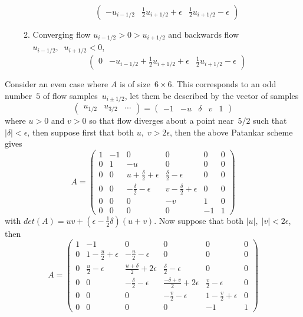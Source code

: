 \begin{enumerate}
\begin{enumerate}
\begin{equation}
\begin{pmatrix}
-u_{i-1/2} & \frac{1}{2}u_{i+1/2}+\epsilon & \frac{1}{2}u_{i+1/2}-\epsilon
\end{pmatrix} \end{equation}
\item Converging flow $u_{i-1/2}>0>u_{i+1/2}$ and backwards flow $u_{i-1/2},\;\; u_{i+1/2} < 0$,
\begin{equation}\begin{pmatrix}
0 & -u_{i-1/2}+\frac{1}{2}u_{i+1/2}+\epsilon & \frac{1}{2}u_{i+1/2}-\epsilon
\end{pmatrix} \end{equation}
\end{enumerate}
\end{enumerate}

Consider an even case where $A$ is of size~$6\times6$. This corresponds
to an odd number~$5$ of flow samples~$u_{i\pm 1/2}$, let them be described by the
vector of samples
\begin{equation} \label{eq:patdi0}
\begin{pmatrix}
u_{1/2} & u_{3/2} & \ldots 
\end{pmatrix}
=
\begin{pmatrix}
-1 & -u & \delta  & v & 1
\end{pmatrix}
\end{equation}
where $u>0$ and $v>0$ so that flow diverges about a  point near~$5/2$ such
that~$|\delta| < \epsilon$, then 
suppose first that both $u,\;v>2\epsilon$, then the above Patankar scheme gives
\begin{equation}\label{eq:patdi1}
A=\begin{pmatrix}
1 & -1 & 0 & 0 & 0 & 0\\
0 & 1 & -u & 0 & 0 & 0\\
0 & 0 & u+\frac{\delta}{2}+\epsilon & \frac{\delta}{2}-\epsilon & 0 & 0\\
0 & 0 & -\frac{\delta}{2}-\epsilon & v-\frac{\delta}{2}+\epsilon & 0 & 0\\
0 & 0 & 0 & -v & 1 & 0\\
0 & 0 & 0 & 0 & -1 & 1
\end{pmatrix}
\end{equation}
with $det(A)=uv+(\epsilon-\frac{1}{2}\delta)(u+v)$.
Now suppose that  both $|u|,\;|v|<2\epsilon$, then
\begin{equation}\label{eq:patdi1eps}
A=\begin{pmatrix}
1 & -1 & 0 & 0 & 0 & 0\\
0 & 1-\frac{u}{2}+\epsilon & -\frac{u}{2}-\epsilon & 0 & 0 & 0\\
0 & \frac{u}{2}-\epsilon & \frac{u+\delta}{2}+2\epsilon & \frac{\delta}{2}-\epsilon & 0 & 0\\
0 & 0 & -\frac{\delta}{2}-\epsilon & \frac{-\delta+v}{2}+2\epsilon & \frac{v}{2}-\epsilon & 0\\
0 & 0 & 0 & -\frac{v}{2}-\epsilon & 1-\frac{v}{2}+\epsilon & 0\\
0 & 0 & 0 & 0 & -1 & 1
\end{pmatrix}
\end{equation}
